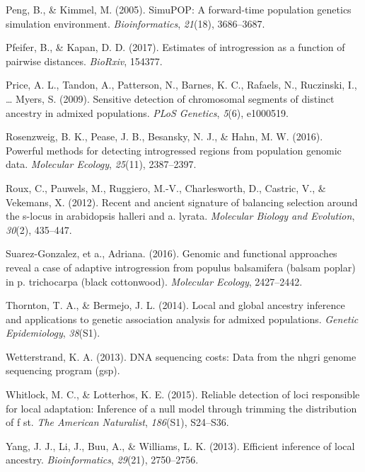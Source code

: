 \documentclass[12pt,twoside]{ugathesis}
\begin{document}
  \hypertarget{ref-peng2005simupop}{}
  Peng, B., \& Kimmel, M. (2005). SimuPOP: A forward-time population
  genetics simulation environment. \emph{Bioinformatics}, \emph{21}(18),
  3686--3687.
  
  \hypertarget{ref-pfeifer2017estimates}{}
  Pfeifer, B., \& Kapan, D. D. (2017). Estimates of introgression as a
  function of pairwise distances. \emph{BioRxiv}, 154377.
  
  \hypertarget{ref-price2009sensitive}{}
  Price, A. L., Tandon, A., Patterson, N., Barnes, K. C., Rafaels, N.,
  Ruczinski, I., \ldots{} Myers, S. (2009). Sensitive detection of
  chromosomal segments of distinct ancestry in admixed populations.
  \emph{PLoS Genetics}, \emph{5}(6), e1000519.
  
  \hypertarget{ref-rosenzweig2016powerful}{}
  Rosenzweig, B. K., Pease, J. B., Besansky, N. J., \& Hahn, M. W. (2016).
  Powerful methods for detecting introgressed regions from population
  genomic data. \emph{Molecular Ecology}, \emph{25}(11), 2387--2397.
  
  \hypertarget{ref-roux2012recent}{}
  Roux, C., Pauwels, M., Ruggiero, M.-V., Charlesworth, D., Castric, V.,
  \& Vekemans, X. (2012). Recent and ancient signature of balancing
  selection around the s-locus in arabidopsis halleri and a. lyrata.
  \emph{Molecular Biology and Evolution}, \emph{30}(2), 435--447.
  
  \hypertarget{ref-suarez2016}{}
  Suarez-Gonzalez, et a., Adriana. (2016). Genomic and functional
  approaches reveal a case of adaptive introgression from populus
  balsamifera (balsam poplar) in p. trichocarpa (black cottonwood).
  \emph{Molecular Ecology}, 2427--2442.
  
  \hypertarget{ref-thornton2014local}{}
  Thornton, T. A., \& Bermejo, J. L. (2014). Local and global ancestry
  inference and applications to genetic association analysis for admixed
  populations. \emph{Genetic Epidemiology}, \emph{38}(S1).
  
  \hypertarget{ref-wetterstrand2013dna}{}
  Wetterstrand, K. A. (2013). DNA sequencing costs: Data from the nhgri
  genome sequencing program (gsp).
  
  \hypertarget{ref-whitlock2015reliable}{}
  Whitlock, M. C., \& Lotterhos, K. E. (2015). Reliable detection of loci
  responsible for local adaptation: Inference of a null model through
  trimming the distribution of f st. \emph{The American Naturalist},
  \emph{186}(S1), S24--S36.
  
  \hypertarget{ref-yang2013efficient}{}
  Yang, J. J., Li, J., Buu, A., \& Williams, L. K. (2013). Efficient
  inference of local ancestry. \emph{Bioinformatics}, \emph{29}(21),
  2750--2756.
\end{document}
